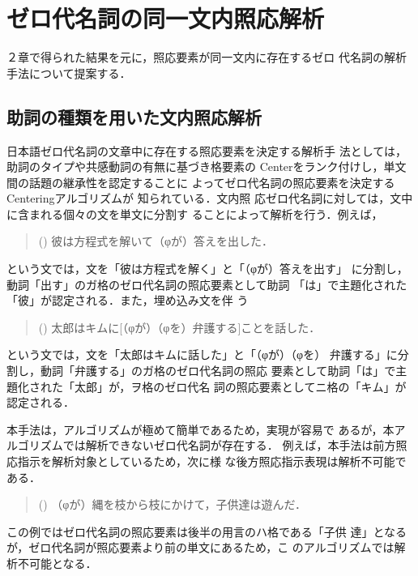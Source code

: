 \section{ゼロ代名詞の同一文内照応解析}

２章で得られた結果を元に，照応要素が同一文内に存在するゼロ
代名詞の解析手法について提案する．

\subsection{助詞の種類を用いた文内照応解析}

日本語ゼロ代名詞の文章中に存在する照応要素を決定する解析手
法としては，助詞のタイプや共感動詞の有無に基づき格要素の
Centerをランク付けし，単文間の話題の継承性を認定することに
よってゼロ代名詞の照応要素を決定するCenteringアルゴリズムが
知られている\cite{Kameyama1986,WalkerIidaCote1990}．文内照
応ゼロ代名詞に対しては，文中に含まれる個々の文を単文に分割す
ることによって解析を行う．例えば，

\begin{quote}
() 彼は方程式を解いて（φが）答えを出した．
\end{quote}

\noindent
という文では，文を「彼は方程式を解く」と「（φが）答えを出す」
に分割し，動詞「出す」のガ格のゼロ代名詞の照応要素として助詞
「は」で主題化された「彼」が認定される．また，埋め込み文を伴
う

\begin{quote}
() 太郎はキムに[（φが）（φを）弁護する]ことを話した．
\end{quote}

\noindent
という文では，文を「太郎はキムに話した」と「（φが）（φを）
弁護する」に分割し，動詞「弁護する」のガ格のゼロ代名詞の照応
要素として助詞「は」で主題化された「太郎」が，ヲ格のゼロ代名
詞の照応要素としてニ格の「キム」が認定される．

本手法は，アルゴリズムが極めて簡単であるため，実現が容易で
あるが，本アルゴリズムでは解析できないゼロ代名詞が存在する．
例えば，本手法は前方照応指示を解析対象としているため，次に様
な後方照応指示表現は解析不可能である．

\begin{quote}
() （φが）縄を枝から枝にかけて，子供達は遊んだ．
\end{quote}

\noindent
この例ではゼロ代名詞の照応要素は後半の用言のハ格である「子供
達」となるが，ゼロ代名詞が照応要素より前の単文にあるため，こ
のアルゴリズムでは解析不可能となる．

